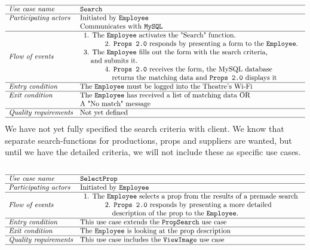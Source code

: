\documentclass[12pt]{article}
\begin{document}
\[
\begin{array}{ll}
\hline
\textit{Use case name} & \texttt{Search} \\
\hline
\textit{Participating actors} & \text{Initiated by \texttt{Employee}} \\
& \text{Communicates with \texttt{MySQL}} \\
\hline
\textit{Flow of events} & 
\begin{array}{l}
\text{1. The \texttt{Employee} activates the "Search" function.}\\
\quad \quad \quad \text{2. \texttt{Props 2.0} responds by presenting a form to the \texttt{Employee}.} \\
\text{3. The \texttt{Employee} fills out the form with the search criteria,} \\ \quad \text{and submits it.} \\
\quad \quad \quad \text{4. \texttt{Props 2.0} receives the form, the MySQL database} \\ \quad \quad \quad \quad \text{returns the matching data and \texttt{Props 2.0} displays it}
\end{array} \\
\hline
\textit{Entry condition} & \text{The \texttt{Employee} must be logged into the Theatre's Wi-Fi} \\
\hline
\textit{Exit condition} & \text{The \texttt{Employee} has received a list of matching data OR} \\ & \text{A "No match"  message} \\
\hline
\textit{Quality requirements} & \text{Not yet defined} \\
\hline
\end{array}
\]
We have not yet fully specified the search criteria with client. We know that separate search-functions for productions, props and suppliers are wanted, but until we have the detailed criteria, we will not include these as specific use cases.  
\\
\\
\[
\begin{array}{ll}
\hline
\textit{Use case name} & \texttt{SelectProp} \\
\hline
\textit{Participating actors} & \text{Initiated by \texttt{Employee}} \\
\hline
\textit{Flow of events} & 
\begin{array}{l}
\text{1. The \texttt{Employee} selects a prop from the results of a premade search} \\
\quad \quad \quad \text{2. \texttt{Props 2.0} responds by presenting a more detailed}\\ \quad \quad \quad \quad \text{description of the prop to the \texttt{Employee}.}
\end{array} \\
\hline
\textit{Entry condition} & \text{This use case extends the  \texttt{PropSearch} use case} \\
\hline
\textit{Exit condition} & \text{The \texttt{Employee} is looking at the prop description} \\
\hline
\textit{Quality requirements} & \text{This use case includes the \texttt{ViewImage} use case} \\
\hline
\end{array}
\]
\end{document}
